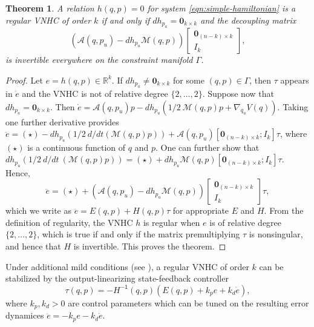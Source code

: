 \documentclass[journal,twoside,web, twocolumn,draftcls]{ieeecolor}
\newtheorem{thm}{Theorem}%
\newcommand*{\inv}{^\mathsf{-1}}
\newcommand*{\R}{\mathbb{R}}
\newcommand*{\Id}[1]{I_{#1}}
\newcommand*{\Zmat}[1]{\bm{0}_{#1}}
\newcommand*{\simpleB}{\begin{bmatrix}\Zmat{(n-k)\times k}\\ \Id{k}\end{bmatrix}}
\begin{document}
\begin{thm}\label{thm:vnhc-regularity}
    A relation \(h(q,p) = 0\) for system \eqref{eqn:simple-hamiltonian}
    is a regular VNHC of order \(k\) if and only if 
    \(dh_{p_a} = \Zmat{k \times k}\) 
    and the decoupling matrix
    \begin{equation}\label{eqn:decoupling-matrix}
        \left(\mathcal{A}(q,p_u) - dh_{p_u}\mathcal{M}(q,p)\right)\simpleB
         ,
     \end{equation}
    is invertible everywhere on the constraint manifold \(\Gamma\).
\end{thm}
\begin{proof}
    Let \(e = h(q,p) \in \R^k\).
    If \(dh_{p_a} \neq \Zmat{k\times k}\) for some \((q,p) \in \Gamma\), 
    then \(\tau\) appears in \(\dot{e}\) and the VNHC is not of relative degree
    \(\{2,\ldots,2\}\). Suppose now that \(dh_{p_a} = \Zmat{k\times k}\).
    Then 
    \(\dot{e} = \mathcal{A}(q,p_u)p - 
     dh_{p_u}\left(1/2~\mathcal{M}(q,p)p + \nabla_{q_u}V(q)\right)\).
    Taking one further derivative provides
    \( \ddot{e} = (\star) - 
        dh_{p_u}\left(1/2~d/dt\left(\mathcal{M}(q,p)p\right)\right) 
        + \mathcal{A}(q,p_u)[\Zmat{(n-k)\times k};\Id{k}] \tau\),
    where \((\star)\) is a continuous function of \(q\) and \(p\).
    One can further show that
    \(dh_{p_u}\left(1/2~d/dt~\left(\mathcal{M}(q,p)p\right)\right)
        = (\star) + dh_{p_u}\mathcal{M}(q,p)[\Zmat{(n-k)\times k};
        \Id{k}]\tau\).
    Hence,
    \[
       \ddot{e} = (\star) +
       \left(\mathcal{A}(q,p_u) - dh_{p_u}\mathcal{M}(q,p)\right) \simpleB \tau
        ,
    \]
    which we write as \( \ddot{e} = E(q,p) + H(q,p)\tau\) for appropriate \(E\)
    and \(H\).
    From the definition of regularity, the VNHC \(h\) is regular 
    when \(e\) is of relative degree \(\{2,\ldots,2\}\), which is true 
    if and only if the matrix premultiplying \(\tau\) is nonsingular, and hence
    that \(H\) is invertible. This proves the theorem.
\end{proof}

Under additional mild conditions (see \cite{vhcs_for_el_systems}), a regular VNHC of
order \(k\) can be stabilized by the output-linearizing state-feedback
controller
\begin{equation}\label{eqn:stabilizing-controller}
    \tau(q,p) = -H\inv(q,p)\left(E(q,p) + k_p e + k_d \dot{e}\right)
    ,
\end{equation}
where \(k_p, k_d > 0\) are control parameters which can be tuned on the
resulting error dynamices \(\ddot{e} = -k_p e - k_d \dot{e}\).
\end{document}
